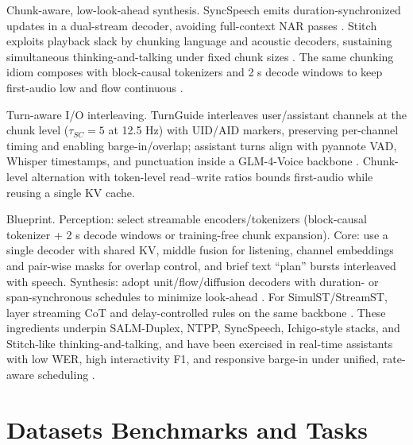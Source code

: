 \documentclass{article}
\begin{document}
Chunk-aware, low-look-ahead synthesis. SyncSpeech emits duration-synchronized updates in a dual-stream decoder, avoiding full-context NAR passes \cite{sheng2025syncspeechlowlatencyefficientdualstreamt}. Stitch exploits playback slack by chunking language and acoustic decoders, sustaining simultaneous thinking-and-talking under fixed chunk sizes \cite{chiang2025stitchsimultaneousthinkingtalkingchunked}. The same chunking idiom composes with block-causal tokenizers and 2 s decode windows to keep first-audio low and flow continuous \cite{zeng2024scalingspeechtextpretrainingsyntheticint}.

Turn-aware I/O interleaving. TurnGuide interleaves user/assistant channels at the chunk level ($\tau_{SC}=5$ at 12.5 Hz) with UID/AID markers, preserving per-channel timing and enabling barge-in/overlap; assistant turns align with pyannote VAD, Whisper timestamps, and punctuation inside a GLM-4-Voice backbone \cite{cui2025thinkbeforeyoutalkenhancingmeaningfuldia}. Chunk-level alternation with token-level read--write ratios bounds first-audio while reusing a single KV cache.

Blueprint. Perception: select streamable encoders/tokenizers (block-causal tokenizer + 2 s decode windows or training-free chunk expansion). Core: use a single decoder with shared KV, middle fusion for listening, channel embeddings and pair-wise masks for overlap control, and brief text ``plan'' bursts interleaved with speech. Synthesis: adopt unit/flow/diffusion decoders with duration- or span-synchronous schedules to minimize look-ahead \cite{sheng2025syncspeechlowlatencyefficientdualstreamt}. For SimulST/StreamST, layer streaming CoT and delay-controlled rules on the same backbone \cite{guo2025streamuniachievingstreamingspeechtransla}. These ingredients underpin SALM-Duplex, NTPP, SyncSpeech, Ichigo-style stacks, and Stitch-like thinking-and-talking, and have been exercised in real-time assistants with low WER, high interactivity F1, and responsive barge-in under unified, rate-aware scheduling \cite{ma2024languagemodelcanlistenwhilespeaking,hu2025salmduplexefficientdirectmodelingspeechl,wang2025ntppgenerativespeechlanguagemodelingdual,chiang2025stitchsimultaneousthinkingtalkingchunked,zeng2024scalingspeechtextpretrainingsyntheticint}.









\section{Datasets Benchmarks and Tasks} \label{sec:Datasets Benchmarks and Tasks}
\end{document}
